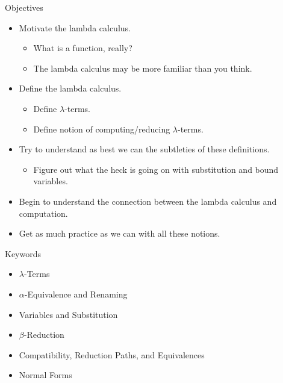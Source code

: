 \documentclass[10pt]{beamer}
\begin{document}
\begin{frame}{Objectives}
\begin{itemize}
\item Motivate the lambda calculus.
\begin{itemize}
\item What is a function, really?
\item The lambda calculus may be more familiar than you think.
\end{itemize}
\pause
\item Define the lambda calculus.
\begin{itemize}
\item Define $\lambda$-terms.
\item Define notion of computing/reducing $\lambda$-terms.
\end{itemize}
\pause
\item Try to understand as best we can the subtleties of these definitions.
\begin{itemize}
\item Figure out what the heck is going on with substitution and bound variables.
\end{itemize}
\pause
\item Begin to understand the connection between the lambda calculus and computation.
\pause
\item Get as much practice as we can with all these notions.
\end{itemize}
\end{frame}

\begin{frame}{Keywords}
\begin{itemize}
\item $\lambda$-Terms
\item $\alpha$-Equivalence and Renaming
\item Variables and Substitution
\item $\beta$-Reduction
\item Compatibility, Reduction Paths, and Equivalences
\item Normal Forms
\end{itemize}
\end{frame}
\end{document}
